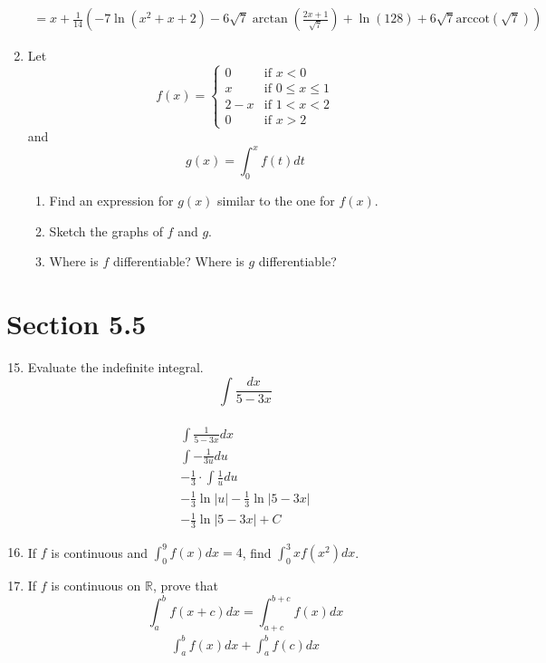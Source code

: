 \documentclass{article}
\begin{document}
\begin{enumerate}
$$\begin{align}
		=x+\frac{1}{14}\left(-7\ln\left(x^2+x+2\right)-6\sqrt{7}\arctan\left(\frac{2x+1}{\sqrt{7}}\right)+\ln(128)+6\sqrt{7}\text{arccot}\left(\sqrt{7}\right)\right)
	\end{align}$$
\setcounter{enumi}{29}
	\item Let $$f(x)=
		\begin{cases}
	        0 & \text{if $x<0$} \\
		    x & \text{if $0\leq x \leq 1$} \\
			2-x & \text{if $1< x < 2$}\\
			0 & \text{if $x>2$}
  \end{cases}$$
  and
  $$g(x)=\int_{0}^{x}f(t)dt$$
  \begin{enumerate}
  	\item Find an expression for $g(x)$ similar to the one for $f(x)$.
  	\vspace{3cm}\pagebreak
  	\item Sketch the graphs of $f$ and $g$.
  	\begin{center}
		\pgfplotsset{width=13cm,height=5cm}
	\end{center}
  	\item Where is $f$ differentiable? Where is $g$ differentiable?
  	\vspace{2cm}
  \end{enumerate}
\end{enumerate}

\section{Section 5.5}
\begin{enumerate}
\setcounter{enumi}{14}
	\item Evaluate the indefinite integral. $$\int \frac{dx}{5-3x}$$\ 
	$$\begin{align}
		\int \frac{1}{5-3x}dx\\
		\int -\frac{1}{3u}du\\
		-\frac{1}{3}\cdot \int \frac{1}{u}du\\
		-\frac{1}{3}\ln|u|
		-\frac{1}{3}\ln|5-3x|\\
		-\frac{1}{3}\ln|5-3x|+C
	\end{align}$$
\setcounter{enumi}{67}
	\item If $f$ is continuous and $\int_{0}^{9}f(x)dx=4$, find $\int_{0}^{3}xf(x^2)dx$.
	\vspace{3cm}
\setcounter{enumi}{69}
	\item If $f$ is continuous on $\mathbb{R}$, prove that $$\int_{a}^{b}f(x+c)dx=\int_{a+c}^{b+c}f(x)dx$$
	$$\begin{align}
		\int_{a}^{b}f(x)dx+\int_{a}^{b}f(c)dx
	\end{align}$$
\end{enumerate}
\end{document}
